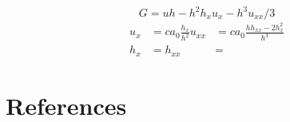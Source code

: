 \documentclass[10pt]{elsarticle}
\begin{document}
\begin{subequations}
\begin{align}
                                                                                                                                                                                                                                                                                                                                                                                                                                                                                                                                                                                                                                                                                                                                                                                                                                                                                                                                                                                                                                                                                                                                                                                     
	\end{align}
\end{subequations}

\begin{equation}
G = uh - h^2 h_x u_x - h^3 u_{xx} / 3
\end{equation}
\begin{align}
u_x &= c a_0 \frac{h_x}{h^2}  u_{xx} &= c a_0 \frac{h h_{xx} - 2h_x^2}{h^3} \\
h_x &=   h_{xx} &= 
\end{align}

\section{References}


\end{document}
